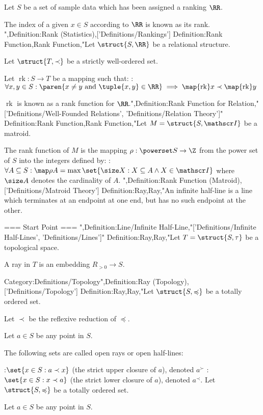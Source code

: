Let $S$ be a set of sample data which has been assigned a ranking $\RR$.

The index of a given $x \in S$ according to $\RR$ is known as its rank.
",Definition:Rank (Statistics),['Definitions/Rankings']
Definition:Rank Function,Rank Function,"Let $\struct {S, \RR}$ be a relational structure.

Let $\struct {T, \prec}$ be a strictly well-ordered set.

Let $\operatorname {rk}: S \to T$ be a mapping such that:
:$\forall x, y \in S: \paren {x \ne y \text { and } \tuple {x, y} \in \RR} \implies \map {\operatorname {rk} } x \prec \map {\operatorname {rk} } y$


$\operatorname {rk}$ is known as a rank function for $\RR$.",Definition:Rank Function for Relation,"['Definitions/Well-Founded Relations', 'Definitions/Relation Theory']"
Definition:Rank Function,Rank Function,"Let $M = \struct {S, \mathscr I}$ be a matroid.


The rank function of $M$ is the mapping $\rho : \powerset S \to \Z$ from the power set of $S$ into the integers defined by:
:$\forall A \subseteq S : \map \rho A = \max \set {\size X : X \subseteq A \land X \in \mathscr I}$
where $\size A$ denotes the cardinality of $A$.
",Definition:Rank Function (Matroid),['Definitions/Matroid Theory']
Definition:Ray,Ray,"An infinite half-line is a line which terminates at an endpoint at one end, but has no such endpoint at the other.


=== Start Point ===
",Definition:Line/Infinite Half-Line,"['Definitions/Infinite Half-Lines', 'Definitions/Lines']"
Definition:Ray,Ray,"Let $T = \struct {S, \tau}$ be a topological space.


A ray in $T$ is an embedding $R_{>0} \to S$.

Category:Definitions/Topology",Definition:Ray (Topology),['Definitions/Topology']
Definition:Ray,Ray,"Let $\struct {S, \preccurlyeq}$ be a totally ordered set.

Let $\prec$ be the reflexive reduction of $\preccurlyeq$.

Let $a \in S$ be any point in $S$.


The following sets are called open rays or open half-lines:

:$\set {x \in S: a \prec x}$ (the strict upper closure of $a$), denoted $a^\succ$
:$\set {x \in S: x \prec a}$ (the strict lower closure of $a$), denoted $a^\prec$.
Let $\struct {S, \preccurlyeq}$ be a totally ordered set.

Let $a \in S$ be any point in $S$.


